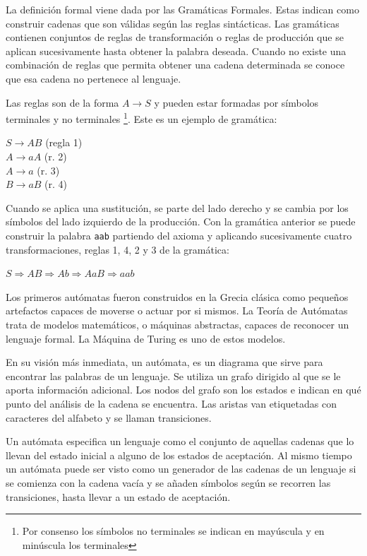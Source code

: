 
La definición formal viene dada por las Gramáticas Formales. Estas indican como construir cadenas que son válidas según las reglas sintácticas. Las gramáticas contienen conjuntos de reglas de transformación o reglas de producción que se aplican sucesivamente hasta obtener la palabra deseada. Cuando no existe una combinación de reglas que permita obtener una cadena determinada se conoce que esa cadena no pertenece al lenguaje.

Las reglas son de la forma $A\rightarrow S$ y pueden estar formadas por símbolos terminales y no terminales \footnote{Por consenso los símbolos no terminales se indican en mayúscula y en minúscula los terminales}. Este es un ejemplo de gramática:
\begin{center}
$S\rightarrow AB$ (regla 1) \\
$A\rightarrow aA$ (r. 2) \\
$A\rightarrow a$ (r. 3) \\
$B\rightarrow aB$ (r. 4) \\
\end{center}

Cuando se aplica una sustitución, se parte del lado derecho y se cambia por los símbolos del lado izquierdo de la producción. Con la gramática anterior se puede construir la palabra \verb|aab| partiendo del axioma y aplicando sucesivamente cuatro transformaciones, reglas 1, 4, 2 y 3 de la gramática:

\begin{center}
$S\Rightarrow AB\Rightarrow Ab \Rightarrow AaB \Rightarrow aab$
\end{center}


Los primeros autómatas fueron construidos en la Grecia clásica como pequeños artefactos capaces de moverse o actuar por si mismos. La Teoría de Autómatas trata de modelos matemáticos, o máquinas abstractas, capaces de reconocer un lenguaje formal. La Máquina de Turing es uno de estos modelos.

En su visión más inmediata, un autómata, es un diagrama que sirve para encontrar las palabras de un lenguaje. Se utiliza un grafo dirigido al que se le aporta información adicional. Los nodos del grafo son los estados e indican en qué punto del análisis de la cadena se encuentra. Las aristas van etiquetadas con caracteres del alfabeto y se llaman transiciones.

Un autómata especifica un lenguaje como el conjunto de aquellas cadenas que lo llevan del estado inicial a alguno de los estados de aceptación. Al mismo tiempo un autómata puede ser visto como un generador de las cadenas de un lenguaje si se comienza con la cadena vacía y se añaden símbolos según se recorren las transiciones, hasta llevar a un estado de aceptación.

